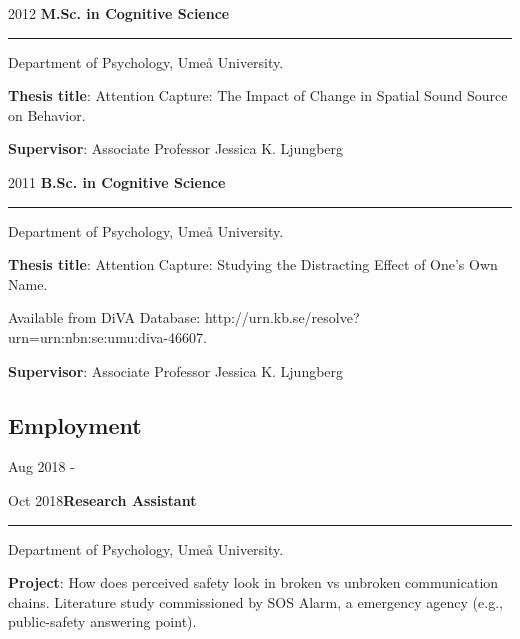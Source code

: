 \documentclass[]{article}
\begin{document}
2012 \hspace{1.5cm}\textbf{M.Sc. in Cognitive Science}

\hrule

\begin{changemargin}{2.3cm}{2.4cm}

Department of Psychology, Umeå University.

\textbf{Thesis title}: Attention Capture: The Impact of Change in Spatial Sound Source on Behavior. 
    
\textbf{Supervisor}: Associate Professor Jessica K. Ljungberg
    
\end{changemargin}

2011 \hspace{1.5cm}\textbf{B.Sc. in Cognitive Science} \hrule

\begin{changemargin}{2.3cm}{2.4cm}


Department of Psychology, Umeå University.

\textbf{Thesis title}:  Attention Capture: Studying the Distracting Effect of One’s Own Name.

Available from DiVA Database: \sloppy http://urn.kb.se/resolve?urn=urn:nbn:se:umu:diva-46607.
    
\textbf{Supervisor}: Associate Professor Jessica K. Ljungberg

\end{changemargin}

\subsection{Employment}\label{employment}

Aug 2018 -

Oct 2018\hspace{0.75cm}\textbf{Research Assistant}

\hrule

\begin{changemargin}{2.3cm}{2.4cm}

Department of Psychology, Umeå University.

\textbf{Project}: How does perceived safety look in broken vs unbroken communication chains. Literature study commissioned by SOS Alarm, a emergency agency (e.g., public-safety answering point).

\end{changemargin}

\newpage 
\end{document}
